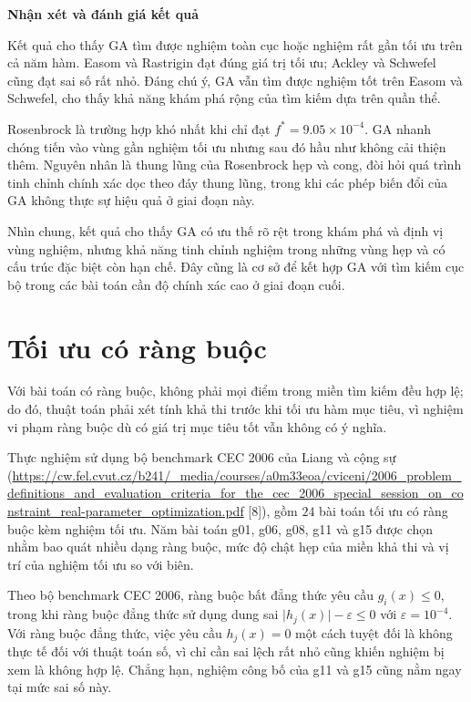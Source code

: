 \textbf{Nhận xét và đánh giá kết quả}

Kết quả cho thấy GA tìm được nghiệm toàn cục hoặc nghiệm rất gần tối
ưu trên cả năm hàm. Easom và Rastrigin đạt đúng giá trị tối ưu; Ackley
và Schwefel cũng đạt sai số rất nhỏ. Đáng chú ý, GA vẫn tìm được
nghiệm tốt trên Easom và Schwefel, cho thấy khả năng khám phá rộng
của tìm kiếm dựa trên quần thể.

Rosenbrock là trường hợp khó nhất khi chỉ đạt $f^{*} = 9.05\times10^{-4}$.
GA nhanh chóng tiến vào vùng gần nghiệm tối ưu nhưng sau đó hầu như
không cải thiện thêm. Nguyên nhân là thung lũng của Rosenbrock hẹp và
cong, đòi hỏi quá trình tinh chỉnh chính xác dọc theo đáy thung lũng,
trong khi các phép biến đổi của GA không thực sự hiệu quả ở giai đoạn
này.

Nhìn chung, kết quả cho thấy GA có ưu thế rõ rệt trong khám phá và
định vị vùng nghiệm, nhưng khả năng tinh chỉnh nghiệm trong những vùng
hẹp và có cấu trúc đặc biệt còn hạn chế. Đây cũng là cơ sở để kết hợp
GA với tìm kiếm cục bộ trong các bài toán cần độ chính xác cao ở giai
đoạn cuối.

\section{Tối ưu có ràng buộc}
\label{sec:ud-co-rang-buoc}

Với bài toán có ràng buộc, không phải mọi điểm trong miền tìm kiếm đều
hợp lệ; do đó, thuật toán phải xét tính khả thi trước khi tối ưu hàm
mục tiêu, vì nghiệm vi phạm ràng buộc dù có giá trị mục tiêu tốt vẫn
không có ý nghĩa.

Thực nghiệm sử dụng bộ benchmark CEC 2006 của Liang và cộng sự
(\url{https://cw.fel.cvut.cz/b241/_media/courses/a0m33eoa/cviceni/2006_problem_definitions_and_evaluation_criteria_for_the_cec_2006_special_session_on_constraint_real-parameter_optimization.pdf}
[8]), gồm $24$ bài toán tối ưu có ràng buộc kèm nghiệm tối ưu. Năm bài
toán g01, g06, g08, g11 và g15 được chọn nhằm bao quát nhiều dạng ràng
buộc, mức độ chật hẹp của miền khả thi và vị trí của nghiệm tối ưu so
với biên.

Theo bộ benchmark CEC 2006, ràng buộc bất đẳng thức yêu cầu $g_i(x) \le 0$,
trong khi ràng buộc đẳng thức sử dụng dung sai
$\lvert h_j(x)\rvert - \varepsilon \le 0$ với $\varepsilon = 10^{-4}$.
Với ràng buộc đẳng thức, việc yêu cầu $h_j(x) = 0$ một cách tuyệt đối
là không thực tế đối với thuật toán số, vì chỉ cần sai lệch rất nhỏ
cũng khiến nghiệm bị xem là không hợp lệ. Chẳng hạn, nghiệm công bố
của g11 và g15 cũng nằm ngay tại mức sai số này.

